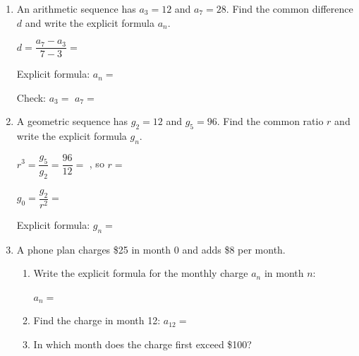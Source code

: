 \documentclass[10pt]{article}
\begin{document}
\begin{tcolorbox}[colback=white, colframe=black!40,
    title=\textbf{Tier A --- Apply},
    fonttitle=\bfseries, arc=2mm, left=3mm, right=3mm, top=2mm, bottom=2mm]

\begin{enumerate}[itemsep=12pt]

  \item An arithmetic sequence has $a_3 = 12$ and $a_7 = 28$.
        Find the common difference $d$ and write the explicit formula $a_n$.

        \vspace{0.04in}
        $d = \dfrac{a_7 - a_3}{7 - 3} = $ 

        \vspace{0.04in}
        Explicit formula: $a_n = $ 

        \vspace{0.04in}
        Check: $a_3 = $  \quad $a_7 = $ 

  \item A geometric sequence has $g_2 = 12$ and $g_5 = 96$.
        Find the common ratio $r$ and write the explicit formula $g_n$.

        \vspace{0.04in}
        $r^3 = \dfrac{g_5}{g_2} = \dfrac{96}{12} = $ , so $r = $ 

        \vspace{0.04in}
        $g_0 = \dfrac{g_2}{r^2} = $ 

        \vspace{0.04in}
        Explicit formula: $g_n = $ 

  \item A phone plan charges \$25 in month 0 and adds \$8 per month.

        \begin{enumerate}[label=(\alph*), itemsep=6pt]
          \item Write the explicit formula for the monthly charge $a_n$ in month $n$:

                $a_n = $ 

          \item Find the charge in month 12: $a_{12} = $ 

          \item In which month does the charge first exceed \$100? 
        \end{enumerate}

\end{enumerate}
\end{tcolorbox}
\end{document}
